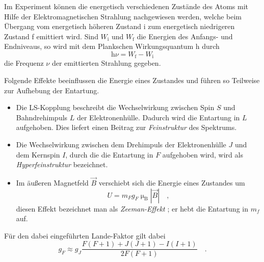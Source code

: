 	Im Experiment können die energetisch verschiedenen Zustände des 
	Atoms mit Hilfe der Elektromagnetischen Strahlung nachgewiesen 
	werden, welche beim Übergang vom energetisch höheren Zustand i zum 
	energetisch niedrigeren Zustand f 
	emittiert wird. Sind $W_\text{i}$ und 
	$W_\text{f}$  die Energien des Anfangs- und Endniveaus, so wird 
	mit dem Plankschen Wirkungsquantum $\text{h}$ durch 
	\begin{equation}
		\text{h} \nu = W_\text{f}- W_\text{i} \label{eq:hnu}
	\end{equation}
	die Frequenz $\nu$ der emittierten Strahlung gegeben.
	
	Folgende Effekte beeinflussen die Energie eines Zustandes und 
	führen so Teilweise zur Aufhebung der Entartung.
	\begin{itemize}
		\item Die LS-Kopplung beschreibt die Wechselwirkung zwischen 
			Spin $S$ und Bahndrehimpuls $L$ der Elektronenhülle. Dadurch 
			wird 
			die Entartung in $L$ aufgehoben. Dies liefert einen 
			Beitrag zur \textit{Feinstruktur} des Spektrums.
		\item Die Wechselwirkung zwischen dem Drehimpuls der 
			Elektronenhülle $J$ und dem Kernspin $I$, durch die  
			die Entartung in $F$ aufgehoben wird, wird als 
			\textit{Hyperfeinstruktur} bezeichnet.
		\item Im äußeren Magnetfeld $\vec{B}$ verschiebt sich die 
			Energie eines Zustandes um 
			\begin{equation}
				U = m_F g_F \upmu_\text{B} |\vec{B}| \quad ,
			\end{equation}
			diesen Effekt bezeichnet man als \textit{Zeeman-Effekt}
			 \cite{Praktikum}; er hebt die Entartung in 
			$m_f$ auf.
	\end{itemize}
	Für den dabei eingeführten Lande-Faktor gilt dabei
	\begin{equation}
		g_F \approx g_J \frac{F(F+1)+J(J+1)-I(I+1)}{2F(F+1)} \quad .
		\label{eq:g_F}
	\end{equation}
	
